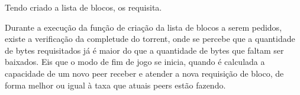 \newpage
Tendo criado a lista de blocos, os requisita.


Durante a execução da função de criação da lista de blocos a serem pedidos, existe a
verificação da completude do \gls*{torrent}, onde se percebe que a quantidade de bytes
requisitados já é maior do que a quantidade de bytes que faltam ser baixados. Eis que o
modo de fim de jogo se inicia, quando é calculada a capacidade de um novo \gls*{peer}
receber e atender a nova requisição de bloco, de forma melhor ou igual à taxa que
atuais \glspl*{peer} estão fazendo.

